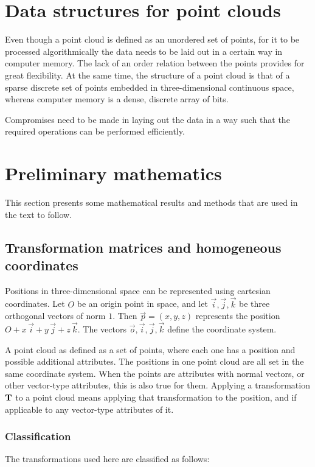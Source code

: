 \section{Data structures for point clouds}
Even though a point cloud is defined as an unordered set of points, for it to be processed algorithmically the data needs to be laid out in a certain way in computer memory. The lack of an order relation between the points provides for great flexibility. At the same time, the structure of a point cloud is that of a sparse discrete set of points embedded in three-dimensional continuous space, whereas computer memory is a dense, discrete array of bits.

Compromises need to be made in laying out the data in a way such that the required operations can be performed efficiently. 




\section{Preliminary mathematics}
This section presents some mathematical results and methods that are used in the text to follow.

\subsection{Transformation matrices and homogeneous coordinates}
Positions in three-dimensional space can be represented using cartesian coordinates. Let $O$ be an origin point in space, and let $\vec{i}, \vec{j}, \vec{k}$ be three orthogonal vectors of norm $1$. Then $\vec{p} = (x, y, z)$ represents the position $O + x \, \vec{i} + y \, \vec{j} + z \, \vec{k}$. The vectors $\vec{o}, \vec{i}, \vec{j}, \vec{k}$ define the coordinate system.

A point cloud as defined as a set of points, where each one has a position and possible additional attributes. The positions in one point cloud are all set in the same coordinate system. When the points are attributes with normal vectors, or other vector-type attributes, this is also true for them. Applying a transformation $\mathbf{T}$ to a point cloud means applying that transformation to the position, and if applicable to any vector-type attributes of it.

\subsubsection{Classification}
The transformations used here are classified as follows:


